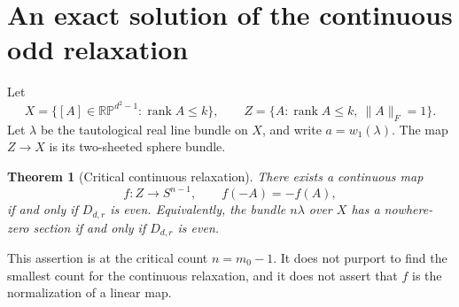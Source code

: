 \documentclass[11pt]{article}
\newtheorem{theorem}{Theorem}[section]
\theoremstyle{remark}\newtheorem{remark}[theorem]{Remark}
\newcommand{\rank}{\operatorname{rank}}\newcommand{\ch}{\operatorname{ch}}
\begin{document}
\section{An exact solution of the continuous odd relaxation}
Let
\[
 X=\{[A]\in\mathbb{RP}^{d^2-1}:\rank A\le k\},\qquad
 Z=\{A:\rank A\le k,\ \|A\|_F=1\}.
\]
Let $\lambda$ be the tautological real line bundle on $X$, and write
$a=w_1(\lambda)$. The map $Z\to X$ is its two-sheeted sphere bundle.

\begin{theorem}[Critical continuous relaxation]\label{continuous}
There exists a continuous map
\[
 f:Z\longrightarrow S^{n-1},\qquad f(-A)=-f(A),
\]
if and only if $D_{d,r}$ is even. Equivalently, the bundle $n\lambda$ over $X$
has a nowhere-zero section if and only if $D_{d,r}$ is even.
\end{theorem}
This assertion is at the critical count $n=m_0-1$. It does not purport to find
the smallest count for the continuous relaxation, and it does not assert that
$f$ is the normalization of a linear map.
\end{document}
